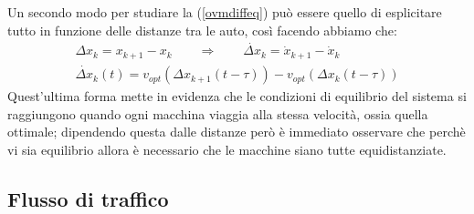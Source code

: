 Un secondo modo per studiare la (\ref{ovmdiffeq}) può essere quello di esplicitare tutto in funzione delle distanze tra le auto, così facendo abbiamo che:
\begin{equation}
	\begin{gathered}
		\Delta x_k=x_{k+1}-x_k \qquad \Rightarrow \qquad \dot{\Delta x}_k=\dot{x}_{k+1}-\dot{x}_{k}\\
		\dot{\Delta x}_k(t)=v_{opt}(\Delta x_{k+1}(t-\tau))-v_{opt}(\Delta x_{k}(t-\tau))
		\label{ovmdiffeqdist}
	\end{gathered}
\end{equation}
Quest'ultima forma mette in evidenza che le condizioni di equilibrio del sistema si raggiungono quando ogni macchina viaggia alla stessa velocità, ossia quella ottimale; dipendendo questa dalle distanze però è immediato osservare che perchè vi sia equilibrio allora è necessario che le macchine siano tutte equidistanziate.
\subsection{Flusso di traffico}

